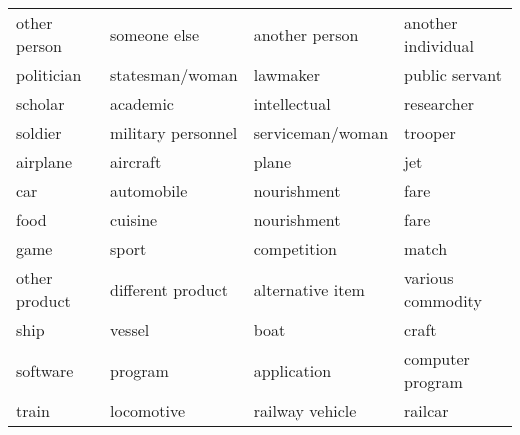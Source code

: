 \documentclass[11pt]{article}
\begin{document}
\begin{table*}[htb]
\begin{center}
{\begin{tabular}{llll}
    other person                                     & someone else                           & another person                         & another individual                     \\
    politician                                       & statesman/woman                        & lawmaker                               & public servant                         \\
    scholar                                          & academic                               & intellectual                           & researcher                             \\
    soldier                                          & military personnel                     & serviceman/woman                       & trooper                                \\
    airplane                                         & aircraft                               & plane                                  & jet                                    \\
    car                                              & automobile                             & nourishment                            & fare                                   \\
    food                                             & cuisine                                & nourishment                            & fare                                   \\
    game                                             & sport                                  & competition                            & match                                  \\
    other product                                    & different product                      & alternative item                       & various commodity                      \\
    ship                                             & vessel                                 & boat                                   & craft                                  \\
    software                                         & program                                & application                            & computer program                       \\
    train                                            & locomotive                             & railway vehicle                        & railcar                                \\

\end{tabular}}
\end{center}
\end{table*}
\end{document}
